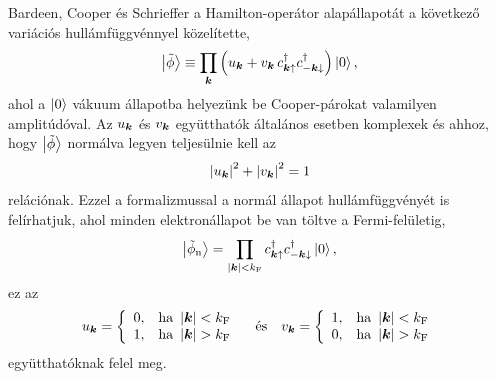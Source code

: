 \documentclass[a4paper,12pt,titlepage]{article}
\newcommand{\KK}{{\vb*{k}}}
\newcommand{\kF}{{k_\text{F}}}
\begin{document}
Bardeen, Cooper és Schrieffer a Hamilton-operátor alapállapotát a következő variációs hullámfüggvénnyel közelítette,
\begin{equation} \label{phi-tilde}
	\ket{\tilde{\phi}} \equiv \prod\limits_\KK \left( u_\KK + v_\KK \, c_{\KK \uparrow}^\dagger c_{-\KK \downarrow}^\dagger \right) \ket{0},
\end{equation}
ahol a $\ket{0}$ vákuum állapotba helyezünk be Cooper-párokat valamilyen amplitúdóval.  Az $u_\KK$ és $v_\KK$ együtthatók általános esetben komplexek és ahhoz, hogy $\ket{\tilde{\phi}}$ normálva legyen teljesülnie kell az
\begin{equation} \label{u-v-norm}
	\left| u_\KK \right|^2 + \left| v_\KK \right|^2 = 1
\end{equation}
relációnak.  Ezzel a formalizmussal a normál állapot hullámfüggvényét is felírhatjuk, ahol minden elektronállapot be van töltve a Fermi-felületig,
\begin{equation}
	\ket{\tilde{\phi}_\text{n}} = \prod\limits_{\left| \KK \right| < \kF} c_{\KK \uparrow}^\dagger c_{-\KK \downarrow}^\dagger \ket{0},
\end{equation}
ez az
\begin{equation} \label{u-v-normal}
	u_\KK = \left\{ \begin{array}{ll} 0, & \text{ha } \left| \KK \right| < \kF \\ 1, & \text{ha } \left| \KK \right| > \kF \end{array} \right.
	~~~ \text{és} ~~~
	v_\KK = \left\{ \begin{array}{ll} 1, & \text{ha } \left| \KK \right| < \kF \\ 0, & \text{ha } \left| \KK \right| > \kF \end{array} \right.
\end{equation}
együtthatóknak felel meg.
\end{document}
